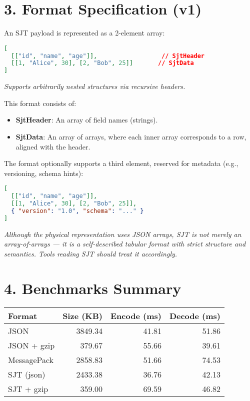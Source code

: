 \documentclass[12pt]{article}
\begin{document}
\section*{3. Format Specification (v1)}

An SJT payload is represented as a 2-element array:

\begin{lstlisting}[language=json]
[
  [["id", "name", "age"]],                  // SjtHeader
  [[1, "Alice", 30], [2, "Bob", 25]]       // SjtData
]
\end{lstlisting}

\textit{Supports arbitrarily nested structures via recursive headers.}

This format consists of:
\begin{itemize}
  \item \textbf{SjtHeader}: An array of field names (strings).
  \item \textbf{SjtData}: An array of arrays, where each inner array corresponds to a row, aligned with the header.
\end{itemize}

The format optionally supports a third element, reserved for metadata (e.g., versioning, schema hints):

\begin{lstlisting}[language=json]
[
  [["id", "name", "age"]],
  [[1, "Alice", 30], [2, "Bob", 25]],
  { "version": "1.0", "schema": "..." }
]
\end{lstlisting}

\textit{Although the physical representation uses JSON arrays, SJT is not merely an array-of-arrays — it is a self-described tabular format with strict structure and semantics. Tools reading SJT should treat it accordingly.}

\section*{4. Benchmarks Summary}

\begin{center}
\begin{tabular}{|l|r|r|r|}
\hline
\textbf{Format} & \textbf{Size (KB)} & \textbf{Encode (ms)} & \textbf{Decode (ms)} \\
\hline
JSON & 3849.34 & 41.81 & 51.86 \\
JSON + gzip & 379.67 & 55.66 & 39.61 \\
MessagePack & 2858.83 & 51.66 & 74.53 \\
SJT (json) & 2433.38 & 36.76 & 42.13 \\
SJT + gzip & 359.00 & 69.59 & 46.82 \\
\hline
\end{tabular}
\end{center}
\end{document}
